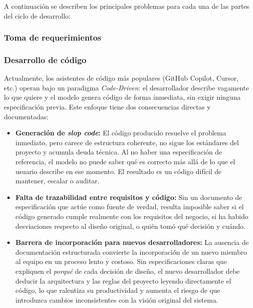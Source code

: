 A continuación se describen los principales problemas para cada una de las partes del ciclo de desarrollo:


\subsubsection{Toma de requerimientos}

\subsubsection{Desarrollo de código}

Actualmente, los asistentes de código más populares (GitHub Copilot, Cursor, etc.) operan bajo un paradigma \textit{Code-Driven}: el desarrollador describe vagamente lo que quiere y el modelo genera código de forma inmediata, sin exigir ninguna especificación previa. Este enfoque tiene dos consecuencias directas y documentadas:

\begin{itemize}
    \item \textbf{Generación de \textit{slop code}:} El código producido resuelve el problema inmediato, pero carece de estructura coherente, no sigue los estándares del proyecto y acumula deuda técnica. Al no haber una especificación de referencia, el modelo no puede saber qué es correcto más allá de lo que el usuario describe en ese momento. El resultado es un código difícil de mantener, escalar o auditar.

    \item \textbf{Falta de trazabilidad entre requisitos y código:} Sin un documento de especificación que actúe como fuente de verdad, resulta imposible saber si el código generado cumple realmente con los requisitos del negocio, si ha habido desviaciones respecto al diseño original, o quién tomó qué decisión y cuándo.

    \item \textbf{Barrera de incorporación para nuevos desarrolladores:} La ausencia de documentación estructurada convierte la incorporación de un nuevo miembro al equipo en un proceso lento y costoso. Sin especificaciones claras que expliquen el \textit{porqué} de cada decisión de diseño, el nuevo desarrollador debe deducir la arquitectura y las reglas del proyecto leyendo directamente el código, lo que ralentiza su productividad y aumenta el riesgo de que introduzca cambios inconsistentes con la visión original del sistema.
\end{itemize}

